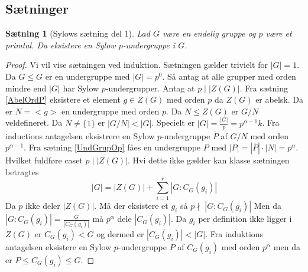 \documentclass{article}
\newtheorem{setn}{Sætning}
\begin{document}
		\subsection*{Sætninger}
		\begin{setn}[Sylows sætning del 1]
			Lad $G$ være en endelig gruppe og $p$ være et primtal.
			Da eksistere en Sylow $p$-undergruppe i $G$.
		\end{setn}
		\begin{proof}
			Vi vil vise sætningen ved induktion. Sætningen gælder trivielt for $|G|=1$.
			Da $G \le G$ er en undergruppe med $|G| = p^0$.
			Så antag at alle grupper med orden mindre end $|G|$ har Sylow $p$-undergrupper.
			Antag at $p \; \Big | \; |Z(G)|$. Fra sætning \ref{AbelOrdP} eksistere et element
			$g \in Z(G)$ med orden $p$ da $Z(G)$ er abelsk. Da er $N = <g>$ en undergruppe med
			orden $p$. Da $N \le Z(G)$ er $G/N$ veldefineret.
			Da $N \ne \{1\}$ er $|G/N| < |G|$. Specielt er $|G| = \frac{|G|}{p} = p^{\alpha-1}k$.
			Fra inductions antagelsen eksistrere en Sylow $p$-undergruppe $\bar{P}$ af $G/N$
			med orden $p^{\alpha-1}$. Fra sætning \ref{UndGrupOp} fåes en undergruppe $P$
			med $|P| = |\bar{P}|\cdot|N| = p^\alpha$. Hvilket fuldføre caset $p \;\Big |\;|Z(G)|$.
			Hvi dette ikke gælder kan klasse sætningen betragtes
			$$|G| = |Z(G)| + \sum_{i=1}^r|G:C_G(g_i)|$$
			Da $p$ ikke deler $|Z(G)|$. Må der eksistere et $g_i$ så $p \nmid \; |G:C_G(g_i)|$
			Men da $|G:C_G(g_i)| = \frac{G}{|C_G(g_i)|}$ må $p^\alpha$ dele $|C_G(g_i)|$.
			Da $g_i$ per definition ikke ligger i $Z(G)$ er $C_G(g_i) < G$ og dermed
			er $|C_G(g_i)| < |G|$. Fra induktions antagelsen eksistere en Sylow $p$-undergruppe
			$P$ af $C_G(g_i)$ med orden $p^\alpha$ men da er $P \le C_G(g_i) \le G$.
		\end{proof}
\end{document}
